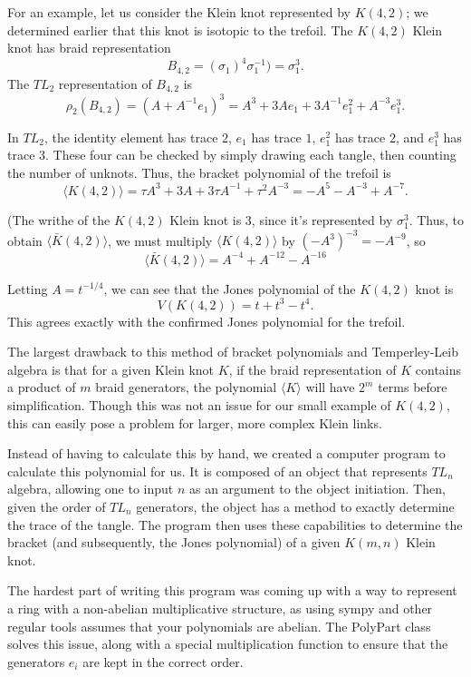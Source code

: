 \documentclass[12pt]{article}
\newenvironment{example}[2][Example]{\begin{trivlist}
\item[\hskip \labelsep {\bfseries #1}\hskip \labelsep {\bfseries #2.}]}{\end{trivlist}}
\begin{document}
\begin{example}{3.1}
For an example, let us consider the Klein knot represented by $K(4, 2)$; we determined earlier that this knot is isotopic to the trefoil. The $K(4, 2)$ Klein knot has braid representation $$B_{4, 2} = (\sigma_1)^4 \sigma_1^{-1}) = \sigma_1^3.$$ The $TL_2$ representation of $B_{4, 2}$ is $$\rho_2(B_{4, 2}) = (A + A^{-1} e_1)^3 = A^3 + 3A e_1 + 3A^{-1} e_1^2 + A^{-3} e_1^3.$$

In $TL_2$, the identity element has trace $2$, $e_1$ has trace $1$, $e_1^2$ has trace $2$, and $e_1^3$ has trace $3$. These four can be checked by simply drawing each tangle, then counting the number of unknots. Thus, the bracket polynomial of the trefoil is $$\langle K(4, 2) \rangle = \tau A^3 + 3A + 3\tau A^{-1} + \tau^2 A^{-3} = -A^5 - A^{-3} + A^{-7}.$$

(The writhe of the $K(4, 2)$ Klein knot is $3$, since it's represented by $\sigma_1^3$. Thus, to obtain $\langle \bar{K}(4, 2) \rangle$, we must multiply $\langle K(4, 2) \rangle$ by $(-A^3)^{-3} = -A^{-9}$, so $$\langle \bar{K}(4, 2) \rangle = A^{-4} + A^{-12} - A^{-16}$$

Letting $A = t^{-1/4}$, we can see that the Jones polynomial of the $K(4, 2)$ knot is $$V(K(4, 2)) = t + t^3 - t^4.$$ This agrees exactly with the confirmed Jones polynomial for the trefoil. 

\end{example}

The largest drawback to this method of bracket polynomials and Temperley-Leib algebra is that for a given Klein knot $K$, if the braid representation of $K$ contains a product of $m$ braid generators, the polynomial $\langle K \rangle$ will have $2^m$ terms before simplification. Though this was not an issue for our small example of $K(4, 2)$, this can easily pose a problem for larger, more complex Klein links. 

Instead of having to calculate this by hand, we created a computer program to calculate this polynomial for us. It is composed of an object that represents $TL_n$ algebra, allowing one to input $n$ as an argument to the object initiation. Then, given the order of $TL_n$ generators, the object has a method to exactly determine the trace of the tangle. The program then uses these capabilities to determine the bracket (and subsequently, the Jones polynomial) of a given $K(m, n)$ Klein knot. 

The hardest part of writing this program was coming up with a way to represent a ring with a non-abelian multiplicative structure, as using sympy and other regular tools assumes that your polynomials are abelian. The PolyPart class solves this issue, along with a special multiplication function to ensure that the generators $e_i$ are kept in the correct order. 
\end{document}
